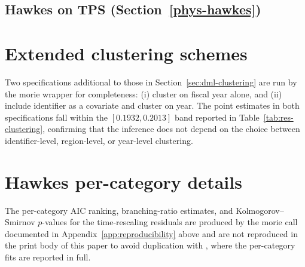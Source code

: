 \documentclass[article,shortnames,nojss]{jss}
\newcommand{\TPS}{\textsf{TPS}}
\begin{document}
\subsection[Hawkes on TPS]{Hawkes on \TPS{} (Section~\ref{phys-hawkes})}


\section{Extended clustering schemes}
\label{app:clustering-extended}

Two specifications additional to those in
Section~\ref{sec:dml-clustering} are run by the morie
 wrapper for completeness: (i) cluster on
fiscal year alone, and (ii) include identifier as a covariate and
cluster on year. The point estimates in both specifications fall
within the $[0.1932, 0.2013]$ band reported in
Table~\ref{tab:res-clustering}, confirming that the inference does
not depend on the choice between identifier-level, region-level, or
year-level clustering.

\section{Hawkes per-category details}
\label{app:hawkes-details}

The per-category AIC ranking, branching-ratio estimates, and
Kolmogorov--Smirnov $p$-values for the time-rescaling residuals are
produced by the morie call documented in
Appendix~\ref{app:reproducibility} above and are not reproduced in
the print body of this paper to avoid duplication with
\citet{Ruhela2026Hawkes}, where the per-category fits are reported
in full.
\end{document}
